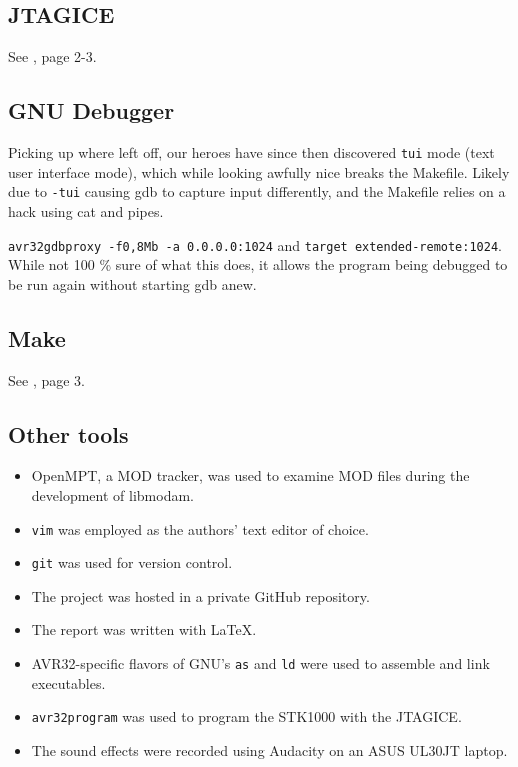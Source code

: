 \subsection{JTAGICE}
    See \cite{tdt4258-1}, page 2-3. 

\subsection{GNU Debugger}
    Picking up where \cite{tdt4258-1} left off, our heroes have since then discovered \texttt{tui} mode (text user interface mode), which while looking awfully nice breaks the Makefile. Likely due to \texttt{-tui} causing gdb to capture input differently, and the Makefile relies on a hack using cat and pipes.

    \texttt{avr32gdbproxy -f0,8Mb -a 0.0.0.0:1024} and \texttt{target extended-remote:1024}. While not 100 \% sure of what this does, it allows the program being debugged to be run again without starting gdb anew.


\subsection{Make}
    See \cite{tdt4258-1}, page 3.

\subsection{Other tools}
    \begin{itemize}
        \item OpenMPT, a MOD tracker, was used to examine MOD files during the development of libmodam.
        \item \texttt{vim} was employed as the authors' text editor of choice.
        \item \texttt{git} was used for version control.
        \item The project was hosted in a private GitHub repository.
        \item The report was written with \LaTeX.
        \item AVR32-specific flavors of GNU's \texttt{as} and \texttt{ld} were used to assemble and link executables.
        \item \texttt{avr32program} was used to program the STK1000 with the JTAGICE.
        \item The sound effects were recorded using Audacity on an ASUS UL30JT laptop.
    \end{itemize}